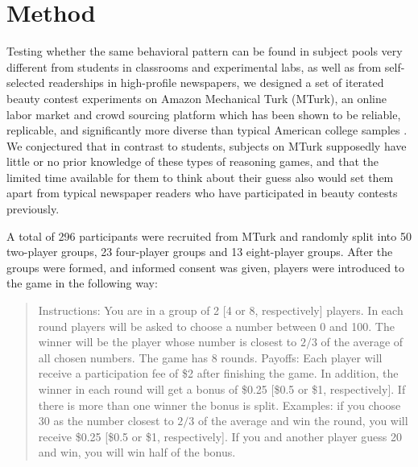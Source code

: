 \documentclass[12pt,review]{elsarticle}
\begin{document}
\section{Method\label{sec:Method}}
\noindent
Testing whether the same behavioral pattern can be found in subject pools very different from students in classrooms and experimental labs, as well as from self-selected readerships in high-profile newspapers, we designed a set of iterated beauty contest experiments on Amazon Mechanical Turk (MTurk), an online labor market and crowd sourcing platform which has been shown to be reliable, replicable, and significantly more diverse than typical American college samples \citep{BuhrmesterEtAl2011,CrumpEtAl13,HortonEtAl2011,Rand2012}. We conjectured that in contrast to students, subjects on MTurk supposedly have little or no prior knowledge of these types of reasoning games, and that the limited time available for them to think about their guess also would set them apart from typical newspaper readers who have participated in beauty contests previously. 

A total of 296 participants were recruited from MTurk and randomly split into 50 two-player groups, 23 four-player groups and 13 eight-player groups. After the groups were formed, and informed consent was given, players were introduced to the game in the following way:

\begin{quote}
Instructions: You are in a group of 2 {[}4 or 8, respectively{]} players.
In each round players will be asked to choose a number between 0 and
100. The winner will be the player whose number is closest to $2/3$
of the average of all chosen numbers. The game has 8 rounds. Payoffs:
Each player will receive a participation fee of \$2 after finishing
the game. In addition, the winner in each round will get a bonus of
\$0.25 {[}\$0.5 or \$1, respectively{]}. If there is more than one
winner the bonus is split. Examples: if you choose 30 as the number
closest to $2/3$ of the average and win the round, you will receive
\$0.25 {[}\$0.5 or \$1, respectively{]}. If you and another player
guess 20 and win, you will win half of the bonus.
\end{quote}
\end{document}
